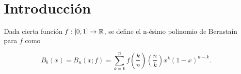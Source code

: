 %

\

\chapter{Introducción}\label{ch:introduccion}
\begin{definicion} \label{def:Bernstein}
    Dada cierta función $f: [0,1] \rightarrow \mathbb{R}$, se define el n-ésimo polinomio de Bernstain para $f$ como 

    $$B_b(x) = B_n(x;f)=\sum_ {k=0}^{n} f \left( \frac{k}{n} \right) \left( \frac{n}{k} \right) x^k (1-x)^{n-k}.$$

\end{definicion}
\endinput
